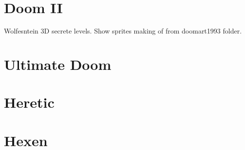 \section{Doom II}
Wolfesntein 3D secrete levels. Show sprites making of from doomart1993 folder.
\section{Ultimate Doom}
\section{Heretic}
\section{Hexen}
